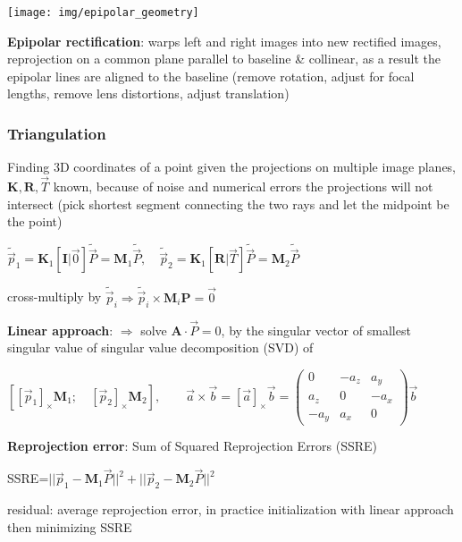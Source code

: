 \documentclass[fontsize=6pt]{scrartcl}
\newcommand{\mat}[1]{\mathbf{#1}}
\begin{document}
\begin{multicols*}{4}
\begin{minipage}{0.6\linewidth}
\texttt{[image: img/epipolar\_geometry]}
\end{minipage}
\begin{minipage}{0.4\linewidth}
\textbf{Epipolar rectification}:
warps left and right images into new rectified images, reprojection on a common plane parallel to baseline \& collinear, as a result the epipolar lines are aligned to the baseline (remove rotation, adjust for focal lengths, remove lens distortions, adjust translation)
\end{minipage}


\subsubsection*{Triangulation}
\nopagebreak

Finding 3D coordinates of a point given the projections on multiple image planes, $\mat K,\mat R,\vec T$ known, because of noise and numerical errors the projections will not intersect (pick shortest segment connecting the two rays and let the midpoint be the point)

$\tilde{\vec p}_1 = \mat K_1 [\mat I | \vec 0] \tilde{\vec P} = \mat M_1 \tilde{\vec P}, \quad \tilde{\vec p}_2 = \mat K_1 [\mat R | \vec T] \tilde{\vec P} = \mat M_2 \tilde{\vec P}$

cross-multiply by $\tilde{\vec p}_i \Rightarrow \tilde{\vec{p}}_i \times \mat M_i \mat P = \vec 0$

\textbf{Linear approach}: $\Rightarrow$ solve $\mat A \cdot \vec P= 0$, by the singular vector of smallest singular value of singular value decomposition (SVD) of

$\left[\left[\vec p_1\right]_\times \mat M_1; \quad \left[\vec p_2\right]_\times \mat M_2\right], \qquad \vec a \times \vec b = \left[\vec a\right]_\times \vec b = \left(\begin{smallmatrix}
0 & -a_z & a_y\\
a_z & 0 & -a_x\\
-a_y & a_x & 0
\end{smallmatrix}\right) \vec b$

\textbf{Reprojection error}: Sum of Squared Reprojection Errors (SSRE)

SSRE=$||\vec p_1 - \mat M_1\vec P||^2 + ||\vec p_2 - \mat M_2\vec P||^2$

residual: average reprojection error, in practice initialization with linear approach then minimizing SSRE


\end{multicols*}
\end{document}
